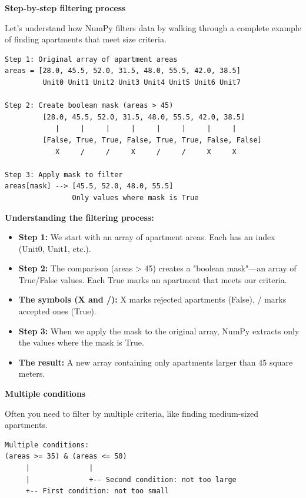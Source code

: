 \begin{tcolorbox}[
    title=How filtering works,
    colframe=purple,
    colback = white,
    arc=2mm,
    breakable
]
\textbf{Step-by-step filtering process}

Let's understand how NumPy filters data by walking through a complete example of finding apartments that meet size criteria.

\begin{lstlisting}[basicstyle=\ttfamily\footnotesize,breaklines=true,columns=fullflexible,keepspaces=true,xleftmargin=0pt]
Step 1: Original array of apartment areas
areas = [28.0, 45.5, 52.0, 31.5, 48.0, 55.5, 42.0, 38.5]
         Unit0 Unit1 Unit2 Unit3 Unit4 Unit5 Unit6 Unit7

Step 2: Create boolean mask (areas > 45)
         [28.0, 45.5, 52.0, 31.5, 48.0, 55.5, 42.0, 38.5]
            |     |     |     |     |     |     |     |
         [False, True, True, False, True, True, False, False]
            X     /     /     X     /     /     X     X

Step 3: Apply mask to filter
areas[mask] --> [45.5, 52.0, 48.0, 55.5]
                Only values where mask is True
\end{lstlisting}

\textbf{Understanding the filtering process:}
\begin{itemize}
\item \textbf{Step 1:} We start with an array of apartment areas. Each has an index (Unit0, Unit1, etc.).
\item \textbf{Step 2:} The comparison (areas > 45) creates a "boolean mask"---an array of True/False values. Each True marks an apartment that meets our criteria.
\item \textbf{The symbols (X and /):} X marks rejected apartments (False), / marks accepted ones (True).
\item \textbf{Step 3:} When we apply the mask to the original array, NumPy extracts only the values where the mask is True.
\item \textbf{The result:} A new array containing only apartments larger than 45 square meters.
\end{itemize}
\vspace{2em}

\textbf{Multiple conditions}

Often you need to filter by multiple criteria, like finding medium-sized apartments.

\begin{lstlisting}[basicstyle=\ttfamily\footnotesize,breaklines=true,columns=fullflexible,keepspaces=true,xleftmargin=0pt]
Multiple conditions:
(areas >= 35) & (areas <= 50)
     |              |
     |              +-- Second condition: not too large
     +-- First condition: not too small
     

\end{lstlisting}
\end{tcolorbox}
